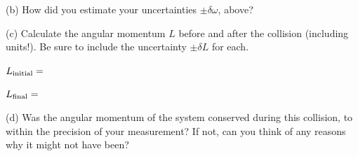 (b) How did you estimate your uncertainties $\pm \delta \omega$, above?
\answerspace{1 in}

(c) Calculate the angular momentum $L$ before and after the collision (including units!).  Be sure to include the uncertainty $\pm\delta L$ for each.

\medskip
\hspace{0.5in} $L_{\rm initial} =$
\answerspace{0.6in}

\hspace{0.5in} $L_{\rm final} =$
\answerspace{0.6in}

(d) Was the angular momentum of the system conserved during this collision, to within the precision of your measurement?  If not, can you think of any reasons why it might not have been?
\answerspace{0.6in}


